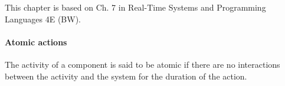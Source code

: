 
This chapter is based on Ch. 7 in Real-Time Systems and Programming Languages 4E (BW).

\sepline

\paragraph{Atomic actions} The activity of a component is said to be atomic if there are no interactions between the activity and the system for the duration of the action.
